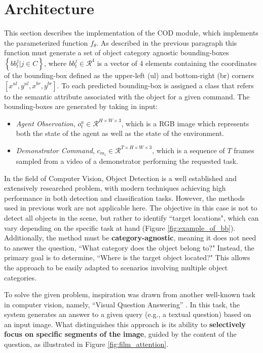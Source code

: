 \section{Architecture}
\label{sec:cod_architecture}
This section describes the implementation of the COD module, which implements the parameterized function $f_{\theta}$. 
\newline 
As described in the previous paragraph this function must generate a set of object category agnostic bounding-boxes $\left\{ bb^{j}_{t} | j \in C \right\}$, where $ bb^{j}_{t}\in \mathcal{R}^{4}$ is a vector of 4 elements containing the coordinates of the bounding-box defined as the upper-left (ul) and bottom-right (br) corners $\left[x^{ul}, y^{ul}, x^{br}, y^{br}\right]$. To each predicted bounding-box is assigned a class that refers to the semantic attribute associated with the object for a given command. 
The bounding-boxes are generated by taking in input:
\begin{itemize}
    \item \textit{Agent Observation},  $o^{a}_{t} \in \mathcal{R}^{H \times W \times 3}$, which is a RGB image which represents both the state of the agent as well as the state of the environment.
    \item \textit{Demonstrator Command}, $c_{m_{i}} \in \mathcal{R}^{T \times H \times W \times 3}$, which is a sequence of $T$ frames sampled from a video of a demonstrator performing the requested task.
\end{itemize}

In the field of Computer Vision, Object Detection is a well established and extensively researched problem, with modern techniques achieving high performance in both detection and classification tasks. However, the methods used in previous work \cite{jiang2023vima, zhu2023viola} are not applicable here. The objective in this case is not to detect all objects in the scene, but rather to identify ``target locations", which can vary depending on the specific task at hand (Figure \ref{fig:example_of_bb}). Additionally, the method must be \textbf{category-agnostic}, meaning it does not need to answer the question, ``What category does the object belong to?" Instead, the primary goal is to determine, ``Where is the target object located?" This allows the approach to be easily adapted to scenarios involving multiple object categories.


To solve the given problem, inspiration was drawn from another well-known task in computer vision, namely, ``Visual Question Answering'' \cite{perez2018film}. In this task, the system generates an answer to a given query (e.g., a textual question) based on an input image. What distinguishes this approach is its ability to \textbf{selectively focus on specific segments of the image}, guided by the content of the question, as illustrated in Figure \ref{fig:film_attention}.


